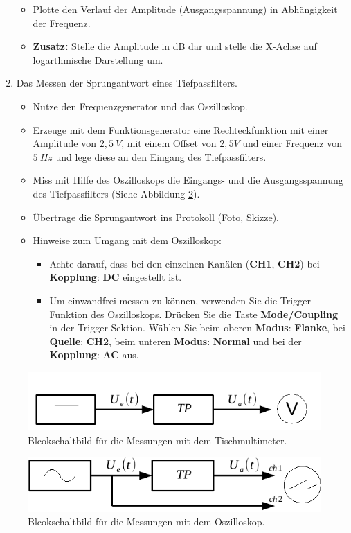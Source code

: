 \begin{enumerate}
\begin{itemize}
			\item Plotte den Verlauf der Amplitude (Ausgangsspannung) in Abhängigkeit der Frequenz.
			\item \textbf{Zusatz:} Stelle die Amplitude in dB dar und stelle die X-Achse auf logarthmische Darstellung um.
			\end{itemize}
	\item Das Messen der Sprungantwort eines Tiefpassfilters.
		\begin{itemize}
			\item Nutze den Frequenzgenerator und das Oszilloskop.
			\item Erzeuge mit dem Funktionsgenerator eine Rechteckfunktion mit einer Amplitude von $2,5~V$, mit einem Offset von $2,5 V$ und einer Frequenz von $5~Hz$ und lege diese an den Eingang des Tiefpassfilters.
			\item Miss mit Hilfe des Oszilloskops die Eingangs- und die Ausgangsspannung des Tiefpassfilters (Siehe Abbildung \ref{block2}).
			\item Übertrage die Sprungantwort ins Protokoll (Foto, Skizze).
			\item Hinweise zum Umgang mit dem Oszilloskop:
				\begin{itemize}
					\item Achte darauf, dass bei den einzelnen Kanälen (\textbf{CH1}, \textbf{CH2}) bei \textbf{Kopplung}: \textbf{DC} eingestellt ist.
					\item Um einwandfrei messen zu können, verwenden Sie die Trigger-Funktion des Oszilloskops. Drücken Sie die Taste \textbf{Mode/Coupling} in der Trigger-Sektion. Wählen Sie beim oberen \textbf{Modus}: \textbf{Flanke}, bei \textbf{Quelle}: \textbf{CH2}, beim unteren \textbf{Modus}: \textbf{Normal} und bei der \textbf{Kopplung}: \textbf{AC} aus.
					\end{itemize}
			\end{itemize}
 	\end{enumerate} 

\begin{figure}[H]
	\centering
	\includegraphics[scale=1]{Messtechnik/Bilder/Block_Messung_Kennlinie.pdf}
	\caption{Blcokschaltbild für die Messungen mit dem Tischmultimeter.}
	\label{block1}
	\end{figure}

\begin{figure}[H]
	\centering
	\includegraphics[scale=1]{Messtechnik/Bilder/Block_Messung_oszi.pdf}
	\caption{Blcokschaltbild für die Messungen mit dem Oszilloskop.}
	\label{block2}
	\end{figure}
